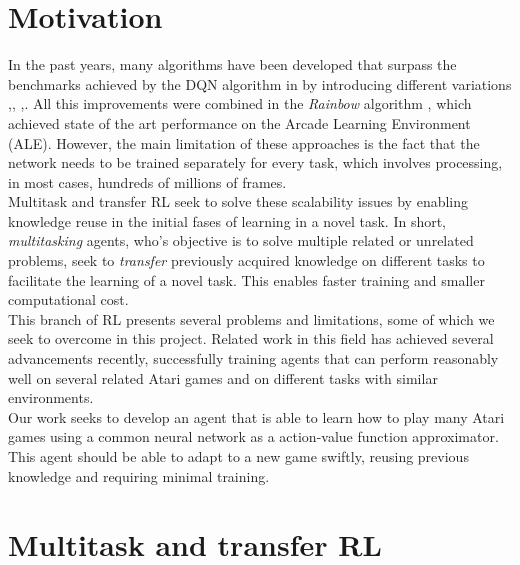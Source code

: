 \documentclass{article}
\begin{document}
\section{Motivation}
In the past years, many algorithms have been developed that surpass the benchmarks achieved by the DQN algorithm in \citep{MnihPlayingLearning} by introducing different variations \citep{Bellemare2017ALearning},\citep{Mnih2015Human-levelLearning}, \citep{vanHasselt2015DeepQ-learning},\citep{Wang2015DuelingLearning}. All this improvements were combined in the \textit{Rainbow} algorithm \citep{Hessel2017Rainbow:Learning}, which achieved state of the art performance on the Arcade Learning Environment (ALE)\citep{Bellemare2013TheAgents}. However, the main limitation of these approaches is the fact that the network needs to be trained separately for every task, which involves processing, in most cases, hundreds of millions of frames.\\
\newline 
Multitask and transfer RL seek to solve these scalability issues by enabling knowledge reuse in the initial fases of learning in a novel task. In short, \textit{multitasking} agents, who's objective is to solve multiple related or unrelated problems, seek to \textit{transfer} previously acquired knowledge on different tasks to facilitate the learning of a novel task. This enables faster training and smaller computational cost.\\
\newline
This branch of RL presents several problems and limitations, some of which we seek to overcome in this project. Related work in this field has achieved several advancements recently, successfully training agents that can perform reasonably well on several related Atari games and on different tasks with similar environments.\\
\newline
Our work seeks to develop an agent that is able to learn how to play many Atari games using a common neural network as a action-value function approximator. This agent should be able to adapt to a new game swiftly, reusing previous knowledge and requiring minimal training.\\
\section{Multitask and transfer RL}
\end{document}
